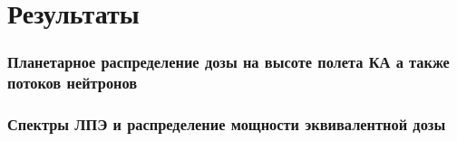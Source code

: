 
\chapter{Результаты}\label{chapt_results}

\subsection{Планетарное распределение дозы на высоте полета КА а также потоков нейтронов}

\subsection{Спектры ЛПЭ и распределение мощности эквивалентной дозы}
